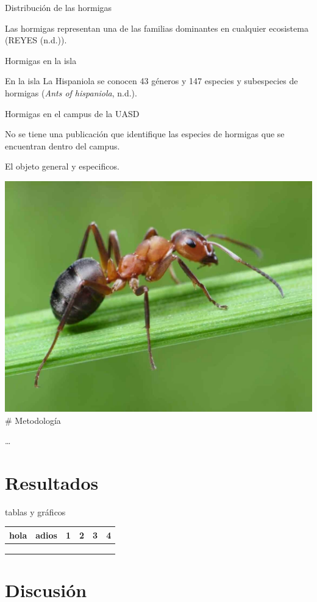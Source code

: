 \documentclass[11pt,]{article}
\begin{document}
Distribución de las hormigas

Las hormigas representan una de las familias dominantes en cualquier
ecosistema (REYES (n.d.)).

Hormigas en la isla

En la isla La Hispaniola se conocen 43 géneros y 147 especies y
subespecies de hormigas (\emph{Ants of hispaniola}, n.d.).

Hormigas en el campus de la UASD

No se tiene una publicación que identifique las especies de hormigas que
se encuentran dentro del campus.

El objeto general y especificos.

\includegraphics{Hormiga-1.jpg} \# Metodología

\ldots

\section{Resultados}\label{resultados}

tablas y gráficos

\begin{longtable}[]{@{}cccccc@{}}
\toprule
hola & adios & 1 & 2 & 3 & 4\tabularnewline
\midrule
\endhead
& & & & &\tabularnewline
& & & & &\tabularnewline
& & & & &\tabularnewline
\bottomrule
\end{longtable}

\section{Discusión}\label{discusiuxf3n}
\end{document}
